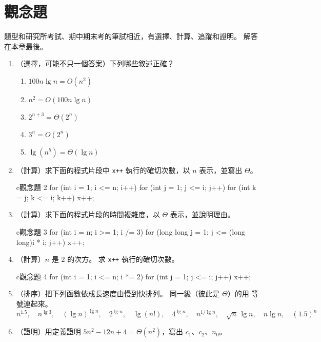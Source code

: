 \section{觀念題}
\label{sec:ana-exercises}

題型和研究所考試、期中期末考的筆試相近，有選擇、計算、追蹤和證明。 解答在本章最後。

\begin{enumerate}
\item （選擇，可能不只一個答案）下列哪些敘述正確？
\begin{enumerate}
\item $100 n \lg n = O(n^2)$
\item $n^2 = O(100 n \lg n)$
\item $2^{n+3} = \Theta(2^n)$
\item $3^n = O(2^n)$
\item $\lg(n^5) = \Theta(\lg n)$
\end{enumerate}

\item （計算）求下面的程式片段中 \texttt{x++} 執行的確切次數，以 $n$ 表示，並寫出
$\Theta$。
\begin{code}{c}{觀念題 2}
for (int i = 1; i <= n; i++)
    for (int j = 1; j <= i; j++)
        for (int k = j; k <= i; k++)
            x++;
\end{code}

\item （計算）求下面的程式片段的時間複雜度，以 $\Theta$ 表示，並說明理由。
\begin{code}{c}{觀念題 3}
for (int i = n; i >= 1; i /= 3)
    for (long long j = 1; j <= (long long)i * i; j++)
        x++;
\end{code}

\item （計算）$n$ 是 $2$ 的次方。 求 \texttt{x++} 執行的確切次數。
\begin{code}{c}{觀念題 4}
for (int i = 1; i <= n; i *= 2)
    for (int j = 1; j <= i; j++)
        x++;
\end{code}

\item （排序）把下列函數依成長速度由慢到快排列。 同一級（彼此是 $\Theta$）的用
等號連起來。
\[
n^{1.5},\quad n^{\lg 3},\quad (\lg n)^{\lg n},\quad 2^{\lg n},\quad \lg(n!),\quad
4^{\lg n},\quad n^{1/\lg n},\quad \sqrt{n}\,\lg n,\quad n \lg n,\quad (1.5)^n
\]

\item （證明）用定義證明 $5n^2 - 12n + 4 = \Theta(n^2)$，寫出 $c_1$、$c_2$、$n_0$。


\end{enumerate}
